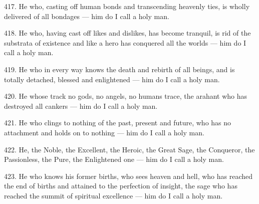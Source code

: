 417. He who, casting off human bonds and transcending heavenly ties, is wholly delivered of all bondages — him do I call a holy man.

418. He who, having cast off likes and dislikes, has become tranquil, is rid of the substrata of existence and like a hero has conquered all the worlds — him do I call a holy man.

419. He who in every way knows the death and rebirth of all beings, and is totally detached, blessed and enlightened — him do I call a holy man.

420. He whose track no gods, no angels, no humans trace, the arahant who has destroyed all cankers — him do I call a holy man.

421. He who clings to nothing of the past, present and future, who has no attachment and holds on to nothing — him do I call a holy man.

422. He, the Noble, the Excellent, the Heroic, the Great Sage, the Conqueror, the Passionless, the Pure, the Enlightened one — him do I call a holy man.

423. He who knows his former births, who sees heaven and hell, who has reached the end of births and attained to the perfection of insight, the sage who has reached the summit of spiritual excellence — him do I call a holy man.
